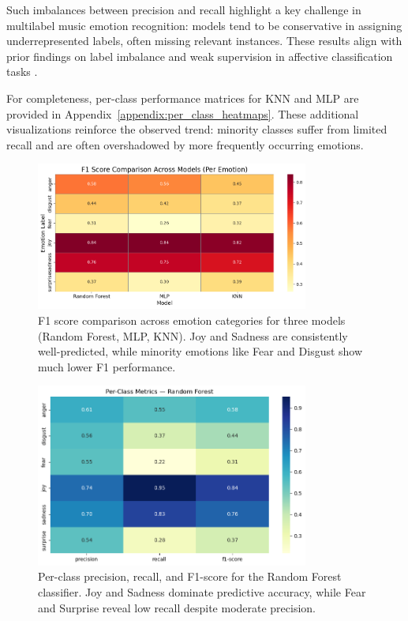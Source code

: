 \documentclass{article}
\begin{document}
Such imbalances between precision and recall highlight a key challenge in multilabel music emotion recognition: models tend to be conservative in assigning underrepresented labels, often missing relevant instances. These results align with prior findings on label imbalance and weak supervision in affective classification tasks \parencite{Ahsan2015, Tuba2025}.

For completeness, per-class performance matrices for KNN and MLP are provided in Appendix~\ref{appendix:per_class_heatmaps}. These additional visualizations reinforce the observed trend: minority classes suffer from limited recall and are often overshadowed by more frequently occurring emotions.

\begin{figure}[H]
\centering
\includegraphics[width=0.8\textwidth]{Graphics/F1 Score Per Emotion.png}
\caption{F1 score comparison across emotion categories for three models (Random Forest, MLP, KNN). Joy and Sadness are consistently well-predicted, while minority emotions like Fear and Disgust show much lower F1 performance.}
\label{fig:per_class_scores}
\end{figure}

\begin{figure}[H]
\centering
\includegraphics[width=0.8\textwidth]{Graphics/per_class_score/per_class_rf.png}
\caption{Per-class precision, recall, and F1-score for the Random Forest classifier. Joy and Sadness dominate predictive accuracy, while Fear and Surprise reveal low recall despite moderate precision.}
\label{fig:per_class_scores_rf}
\end{figure}
\end{document}
